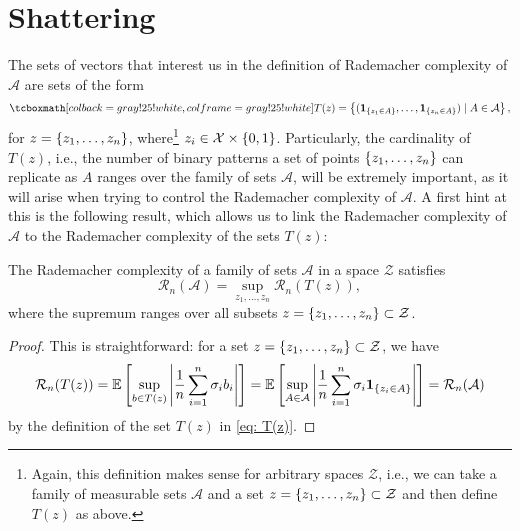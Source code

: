 \section{Shattering}
\label{sec: shattering}

The sets of vectors that interest us in the definition of Rademacher complexity of
$\mathcal{A}$ are sets of the form
\begin{equation}
\label{eq: T(z)}
    \highlightMath{
        T(z) = \set{(\indSet{z_1 \in A}, \dots, \indSet{z_n \in A}) \with A \in \mathcal{A}},
    }
\end{equation}
for $z = \left\{z_1, \dots, z_n\right\}$, where\footnote{Again, this definition makes sense for arbitrary spaces $\mathcal{Z}$, i.e., we can take a family of measurable sets $\mathcal{A}$ and a set $z = \left\{z_1, \dots, z_n\right\} \subset \mathcal{Z}$ and then define $T(z)$ as above.} $z_i \in \mathcal{X} \times \left\{0, 1\right\}$. Particularly, the cardinality of $T(z)$, i.e., the number of binary patterns a set of points $\left\{z_1, \dots, z_n\right\}$ can replicate as $A$ ranges over the family of sets $\mathcal{A}$, will be extremely important, as it will arise when trying to control the Rademacher complexity of $\mathcal{A}$. A first hint at this is the following result, which allows us to link the Rademacher complexity of $\mathcal{A}$ to the Rademacher complexity of the sets $T(z)$:

\begin{lemma}
\label{lem: rademacher complexity}
The Rademacher complexity of a family of sets $\mathcal{A}$ in a space $\mathcal{Z}$ satisfies
\[
    \mathcal{R}_n(\mathcal{A}) = \sup_{z_1, \dots, z_n} \mathcal{R}_n(T(z)),
\]
where the supremum ranges over all subsets $z = \left\{z_1, \dots, z_n\right\} \subset \mathcal{Z}$.
\end{lemma}

\begin{proof}
This is straightforward: for a set $z = \left\{z_1, \dots, z_n\right\} \subset \mathcal{Z}$, we have
\[
    \mathcal{R}_n(T(z)) = \mathbb{E}\left[ \sup_{b \in T(z)} \abs{\frac{1}{n} \sum_{i=1}^n \sigma_i b_i}\right] = \mathbb{E}\left[ \sup_{A \in \mathcal{A}} \abs{\frac{1}{n} \sum_{i=1}^n \sigma_i \mathbf{1}_{\left\{z_i \in A\right\}}}\right] = \mathcal{R}_n(\mathcal{A})
\]
by the definition of the set $T(z)$ in \eqref{eq: T(z)}.
\end{proof}

